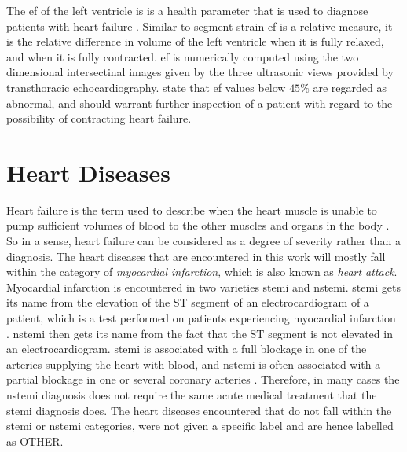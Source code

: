 The \acrfull{ef} of the left ventricle is is a health parameter that is used to diagnose patients with heart failure \cite{myocardial_imaging}. Similar to segment strain \acrshort{ef} is a relative measure, it is the relative difference in volume of the left ventricle when it is fully relaxed, and when it is fully contracted. \acrshort{ef} is numerically computed using the two dimensional intersectinal images given by the three ultrasonic views provided by transthoracic echocardiography. \textcite{myocardial_imaging} state that \acrshort{ef} values below $45\%$ are regarded as abnormal, and should warrant further inspection of a patient with regard to the possibility of contracting heart failure.

\section{Heart Diseases}

Heart failure is the term used to describe when the heart muscle is unable to pump sufficient volumes of blood to the other muscles and organs in the body \cite{medicine_net}. So in a sense, heart failure can be considered as a degree of severity rather than a diagnosis. The heart diseases that are encountered in this work will mostly fall within the category of \textit{myocardial infarction}, which is also known as \textit{heart attack}. Myocardial infarction is encountered in two varieties \acrfull{stemi} and \acrfull{nstemi}. \acrshort{stemi} gets its name from the elevation of the ST segment of an electrocardiogram of a patient, which is a test performed on patients experiencing myocardial infarction \cite{ecg_stemi}. \acrshort{nstemi} then gets its name from the fact that the ST segment is not elevated in an electrocardiogram. \acrshort{stemi} is associated with a full blockage in one of the arteries supplying the heart with blood, and \acrshort{nstemi} is often associated with a partial blockage in one or several coronary arteries \cite{ambulanseforum}. Therefore, in many cases the \acrshort{nstemi} diagnosis does not require the same acute medical treatment that the \acrshort{stemi} diagnosis does. The heart diseases encountered that do not fall within the \acrshort{stemi} or \acrshort{nstemi} categories, were not given a specific label and are hence labelled as OTHER. \bigskip

